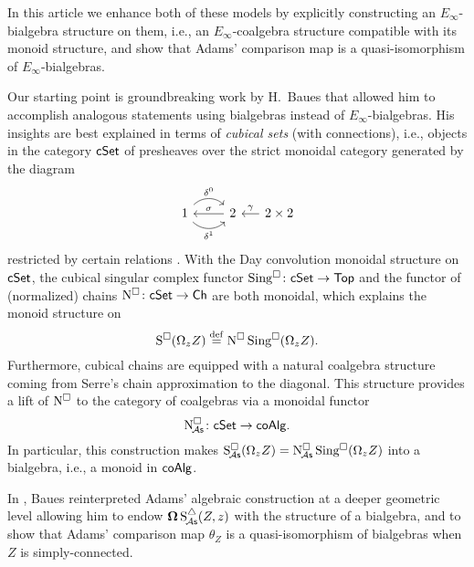 In this article we enhance both of these models by explicitly constructing an $E_\infty$-bialgebra structure on them, i.e., an $E_\infty$-coalgebra structure compatible with its monoid structure, and show that Adams' comparison map is a quasi-isomorphism of $E_\infty$-bialgebras.

Our starting point is groundbreaking work by H.~Baues that allowed him to accomplish analogous statements using bialgebras instead of $E_\infty$-bialgebras.
His insights are best explained in terms of \textit{cubical sets} (with connections), i.e., objects in the category $\mathsf{cSet}$ of presheaves over the strict monoidal category generated by the diagram
\[
\begin{tikzcd}
1 \arrow[r, out=45, in=135, "\delta^0"] \arrow[r, out=-45, in=-135, "\delta^1"'] & 2 \arrow[l, "\sigma"'] &[-10pt] \arrow[l, "\gamma"'] 2 \times 2
\end{tikzcd}
\]
restricted by certain relations \cite{brown1981cubes}.
With the Day convolution monoidal structure on $\mathsf{cSet}$, the cubical singular complex functor $\operatorname{Sing^{\square}} \colon \mathsf{cSet} \to \mathsf{Top}$ and the functor of (normalized) chains $\operatorname{N^{\square}} \colon \mathsf{cSet} \to \mathsf{Ch}$ are both monoidal, which explains the monoid structure on
\[
\operatorname{S^{\square}}(\Omega_z Z) \stackrel{\mathrm{def}}{=} \operatorname{N^{\square}} \operatorname{Sing^{\square}}(\Omega_z Z).
\]
Furthermore, cubical chains are equipped with a natural coalgebra structure coming from Serre's chain approximation to the diagonal.
This structure provides a lift of $\operatorname{N^{\square}}$ to the category of coalgebras via a monoidal functor
\[
\operatorname{N^{\square}_{\!{\mathcal{A}\mathsf{s}}}} \colon \mathsf{cSet} \to \mathsf{coAlg}.
\]
In particular, this construction makes $\operatorname{S^{\square}_{\!{\mathcal{A}\mathsf{s}}}}(\Omega_z Z)=\operatorname{N^{\square}_{\!{\mathcal{A}\mathsf{s}}}}\operatorname{Sing^{\square}}(\Omega_z Z)$ into a bialgebra, i.e., a monoid in $\mathsf{coAlg}$.

In \cite{baues1998hopf}, Baues reinterpreted Adams' algebraic construction at a deeper geometric level allowing him to endow $\operatorname{\mathbf{\Omega}} \operatorname{S^{\triangle}_{\!{\mathcal{A}\mathsf{s}}}}(Z,z)$ with the structure of a bialgebra, and to show that Adams' comparison map $\theta_Z$ is a quasi-isomorphism of bialgebras when $Z$ is simply-connected.

